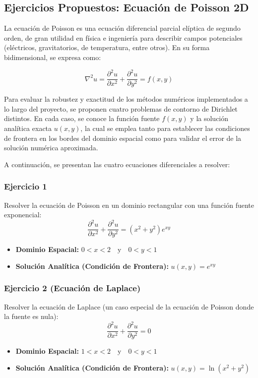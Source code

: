 \subsection{Ejercicios Propuestos: Ecuación de Poisson 2D}
La ecuación de Poisson es una ecuación diferencial parcial elíptica de segundo orden, de gran utilidad en física e ingeniería para describir campos potenciales (eléctricos, gravitatorios, de temperatura, entre otros). En su forma bidimensional, se expresa como:

\begin{equation}
    \nabla^2 u = \frac{\partial^2 u}{\partial x^2} + \frac{\partial^2 u}{\partial y^2} = f(x,y)
\end{equation}

Para evaluar la robustez y exactitud de los métodos numéricos implementados a lo largo del proyecto, se proponen cuatro problemas de contorno de Dirichlet distintos. En cada caso, se conoce la función fuente $f(x,y)$ y la solución analítica exacta $u(x,y)$, la cual se emplea tanto para establecer las condiciones de frontera en los bordes del dominio espacial como para validar el error de la solución numérica aproximada.

A continuación, se presentan las cuatro ecuaciones diferenciales a resolver:

\subsubsection*{Ejercicio 1}
Resolver la ecuación de Poisson en un dominio rectangular con una función fuente exponencial:
\begin{equation}
    \frac{\partial^2 u}{\partial x^2} + \frac{\partial^2 u}{\partial y^2} = (x^2 + y^2)e^{xy}
\end{equation}
\begin{itemize}
    \item \textbf{Dominio Espacial:} $0 < x < 2 \quad \text{y} \quad 0 < y < 1$
    \item \textbf{Solución Analítica (Condición de Frontera):} $u(x,y) = e^{xy}$
\end{itemize}

\subsubsection*{Ejercicio 2 (Ecuación de Laplace)}
Resolver la ecuación de Laplace (un caso especial de la ecuación de Poisson donde la fuente es nula):
\begin{equation}
    \frac{\partial^2 u}{\partial x^2} + \frac{\partial^2 u}{\partial y^2} = 0
\end{equation}
\begin{itemize}
    \item \textbf{Dominio Espacial:} $1 < x < 2 \quad \text{y} \quad 0 < y < 1$
    \item \textbf{Solución Analítica (Condición de Frontera):} $u(x,y) = \ln(x^2 + y^2)$
\end{itemize}

